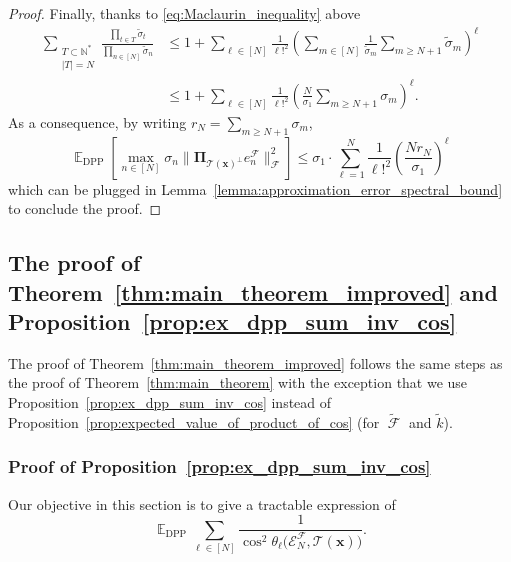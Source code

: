 \documentclass[twoside,11pt]{book}
\numberwithin{theorem}{chapter}
\numberwithin{definition}{chapter}
\numberwithin{proposition}{chapter}
\numberwithin{corollary}{chapter}
\numberwithin{example}{chapter}
\numberwithin{lemma}{chapter}
\numberwithin{assumption}{chapter}
\numberwithin{equation}{chapter}
\numberwithin{figure}{chapter}
\DeclareMathOperator{\DPP}{\mathrm{DPP}}
\DeclareMathOperator{\EX}{\mathbb{E}}
\DeclareMathOperator{\F}{\mathcal{F}}
\begin{document}
\begin{proof}
%
Finally, thanks to \eqref{eq:Maclaurin_inequality} above
\begin{align}
  \sum\limits_{\substack{T \subset \mathbb{N}^{*} \\ |T| = N}} \frac{ \prod\limits_{t \in T}\tilde{\sigma}_{t}}{\prod\limits_{n \in [N]} \tilde{\sigma}_{n}}
  & \leq  1 + \sum\limits_{\ell \in [N]} \frac{1}{\ell!^{2}} \left(\sum\limits_{m \in [N]}\frac{1}{\tilde{\sigma}_{m}} \sum\limits_{m \geq N+1} \tilde{\sigma}_{m}\right)^{\ell} \\
  & \leq 1+ \sum\limits_{\ell \in [N]} \frac{1}{\ell!^{2}} \left(\frac{N}{\sigma_1} \sum\limits_{m \geq N+1} \sigma_{m}\right)^{\ell} \nonumber.
\end{align}
%
As a consequence, by writing $r_{N} = \sum\limits_{m \geq N+1} \sigma_{m}$,
\begin{equation}
  \EX_{\DPP} \left[ \max_{ n \in [N]}\sigma_n \|\bm{\Pi}_{\mathcal{T}(\bm{x})^{\perp}} e_{n}^{\mathcal{F}}\|_{\mathcal{F}}^{2} \right]
  \leq
  \sigma_1 \cdot \sum_{\ell=1}^{N} \frac{1}{\ell!^{2}} \left(\frac{N  r_{N} }{\sigma_1}\right)^{\ell}
\end{equation}
which can be plugged in Lemma~\ref{lemma:approximation_error_spectral_bound} to conclude the proof.
\end{proof}


\subsection{The proof of Theorem~\ref{thm:main_theorem_improved} and Proposition~\ref{prop:ex_dpp_sum_inv_cos}}\label{sec:dppkq_last_proof}

The proof of Theorem~\ref{thm:main_theorem_improved} follows the same steps as the proof of Theorem~\ref{thm:main_theorem} with the exception that we use Proposition~\ref{prop:ex_dpp_sum_inv_cos} instead of Proposition~\ref{prop:expected_value_of_product_of_cos} (for $\tilde{\F}$ and $\tilde{k}$).


\subsubsection{Proof of Proposition~\ref{prop:ex_dpp_sum_inv_cos}}
Our objective in this section is to give a tractable expression of 
\begin{equation}
\EX_{\DPP} \sum\limits_{\ell \in [N]} \frac{1}{\cos^{2} \theta_{\ell} \bigg(\mathcal{E}^{\mathcal{F}}_{N}, \mathcal{T}(\bm{x}) \bigg)}.
\end{equation}
\end{document}
